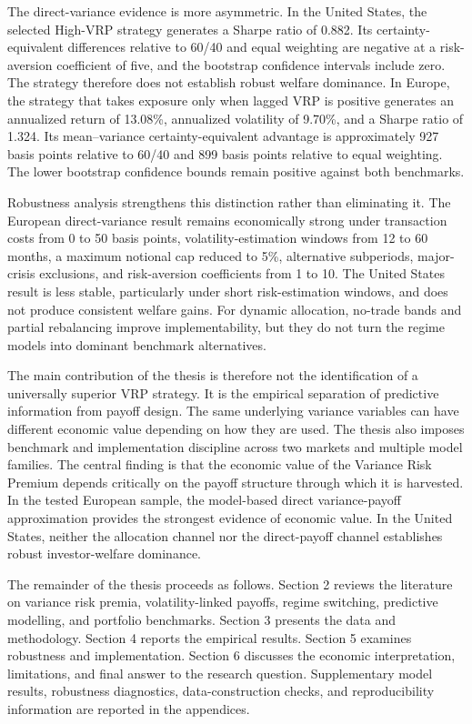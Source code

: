 The direct-variance evidence is more asymmetric. In the United States, the selected High-VRP strategy generates a Sharpe ratio of 0.882. Its certainty-equivalent differences relative to 60/40 and equal weighting are negative at a risk-aversion coefficient of five, and the bootstrap confidence intervals include zero. The strategy therefore does not establish robust welfare dominance. In Europe, the strategy that takes exposure only when lagged VRP is positive generates an annualized return of 13.08\%, annualized volatility of 9.70\%, and a Sharpe ratio of 1.324. Its mean--variance certainty-equivalent advantage is approximately 927 basis points relative to 60/40 and 899 basis points relative to equal weighting. The lower bootstrap confidence bounds remain positive against both benchmarks.

Robustness analysis strengthens this distinction rather than eliminating it. The European direct-variance result remains economically strong under transaction costs from 0 to 50 basis points, volatility-estimation windows from 12 to 60 months, a maximum notional cap reduced to 5\%, alternative subperiods, major-crisis exclusions, and risk-aversion coefficients from 1 to 10. The United States result is less stable, particularly under short risk-estimation windows, and does not produce consistent welfare gains. For dynamic allocation, no-trade bands and partial rebalancing improve implementability, but they do not turn the regime models into dominant benchmark alternatives.

The main contribution of the thesis is therefore not the identification of a universally superior VRP strategy. It is the empirical separation of predictive information from payoff design. The same underlying variance variables can have different economic value depending on how they are used. The thesis also imposes benchmark and implementation discipline across two markets and multiple model families. The central finding is that the economic value of the Variance Risk Premium depends critically on the payoff structure through which it is harvested. In the tested European sample, the model-based direct variance-payoff approximation provides the strongest evidence of economic value. In the United States, neither the allocation channel nor the direct-payoff channel establishes robust investor-welfare dominance.

The remainder of the thesis proceeds as follows. Section 2 reviews the literature on variance risk premia, volatility-linked payoffs, regime switching, predictive modelling, and portfolio benchmarks. Section 3 presents the data and methodology. Section 4 reports the empirical results. Section 5 examines robustness and implementation. Section 6 discusses the economic interpretation, limitations, and final answer to the research question. Supplementary model results, robustness diagnostics, data-construction checks, and reproducibility information are reported in the appendices.
